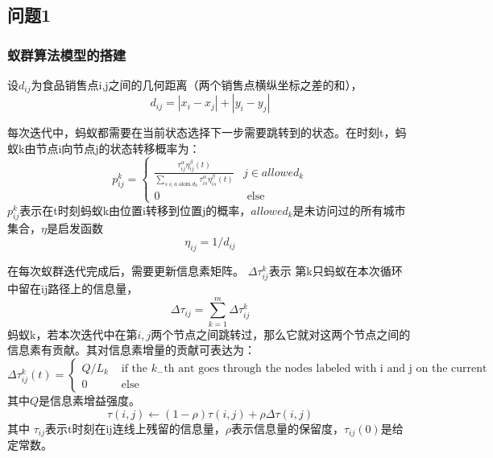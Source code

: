 \documentclass{cumcmthesis}
\begin{document}
\subsection{问题1}

    \subsubsection{蚁群算法模型的搭建}

    设$d_{ij}$为食品销售点i,j之间的几何距离（两个销售点横纵坐标之差的和），
        $$d_{i j}=|x_{i}-x_{j}|+|y_{i}-y_{j}|$$ 
    
    每次迭代中，蚂蚁都需要在当前状态选择下一步需要跳转到的状态。在时刻t，蚂蚁k由节点i向节点j的状态转移概率为：
    $$p_{i j}^{k}=\left\{\begin{array}{ll}
        \frac{\tau_{i j}^{\alpha} \eta_{i j}^{\beta}(t)}{\sum_{s \in a \operatorname{alom} d_{k}} \tau_{i s}^{\alpha} \eta_{i s}^{\beta}(t)} & j \in allowed_{k}\\
        0 & \text { else }
        \end{array}\right.$$
    $p_{i j}^{k}$表示在t时刻蚂蚁k由位置i转移到位置j的概率，$allowed_{k}$是未访问过的所有城市集合，$\eta$是启发函数
    $$\eta_{i j}=1/d_{ij}$$

    在每次蚁群迭代完成后，需要更新信息素矩阵。
    $\Delta\tau_{i j}^k$表示 第k只蚂蚁在本次循环中留在ij路径上的信息量，                                 
    $$\Delta \tau_{i j}=\sum_{k=1}^{m} \Delta \tau_{i j}^{k}$$ 
    蚂蚁k，若本次迭代中在第$i,j$两个节点之间跳转过，那么它就对这两个节点之间的信息素有贡献。其对信息素增量的贡献可表达为：
    $$\Delta \tau_{i j}^{k}(t)=\left\{\begin{array}{ll}Q / L_{k} & \text { if the } k _{-} \text {th ant goes through the nodes labeled with i and j on the current iteration } \\ 0 & \text { else }\end{array}\right.$$
    其中$Q$是信息素增益强度。
    $$\tau(i, j) \leftarrow(1-\rho) \tau(i, j)+\rho \Delta \tau(i, j)$$
    其中 $\tau_{i j}$表示t时刻在ij连线上残留的信息量，$\rho$表示信息量的保留度，$\tau_{i j}(0)$是给定常数。
\end{document}
